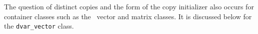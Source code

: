\documentclass[12pt]{book}
\begin{document}
% 
% 

The question of distinct copies and the form of the copy initializer 
also occurs for container classes such as the
\AD\ vector and matrix classes. It is discussed below for the
{\tt dvar\_vector} class.
\end{document}
